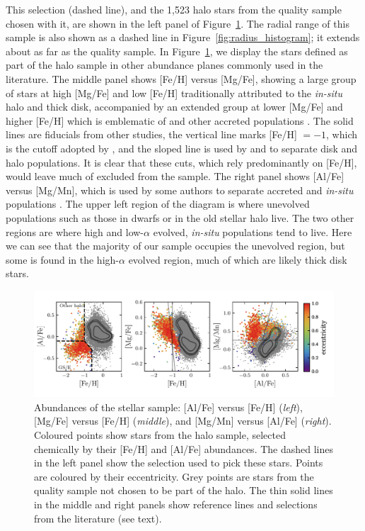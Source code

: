 This selection (dashed line), and the 1,523 halo stars from the quality sample chosen with it, are shown in the left panel of Figure~\ref{fig:halo_abundances}. The radial range of this sample is also shown as a dashed line in Figure~\ref{fig:radius_histogram}; it extends about as far as the quality sample. In Figure~\ref{fig:halo_abundances}, we display the stars defined as part of the halo sample in other abundance planes commonly used in the literature. The middle panel shows [Fe/H] versus [Mg/Fe], showing a large group of stars at high [Mg/Fe] and low [Fe/H] traditionally attributed to the \textit{in-situ} halo and thick disk, accompanied by an extended group at lower [Mg/Fe] and higher [Fe/H] which is emblematic of \gse and other accreted populations \parencite[e.g.][]{hasselquist21,horta23a}. The solid lines are fiducials from other studies, the vertical line marks [Fe/H] $= -1$, which is the cutoff adopted by \cite{mackereth20}, and the sloped line is used by \textcite{mackereth19a} and \cite{lane22} to separate disk and halo populations. It is clear that these cuts, which rely predominantly on [Fe/H], would leave much of \gse excluded from the sample. The right panel shows [Al/Fe] versus [Mg/Mn], which is used by some authors to separate accreted and \textit{in-situ} populations \parencite[e.g.][]{das20,horta21a,fernandez23}. The upper left region of the diagram is where unevolved populations such as those in dwarfs or in the old stellar halo live. The two other regions are where high and low-$\alpha$ evolved, \textit{in-situ} populations tend to live. Here we can see that the majority of our sample occupies the unevolved region, but some is found in the high-$\alpha$ evolved region, much of which are likely thick disk stars.

\begin{figure}
    \centering
    \includegraphics[width=\linewidth]{figure/ch3/halo_abundances.pdf}
    \caption{Abundances of the stellar sample: [Al/Fe] versus [Fe/H] (\textit{left}), [Mg/Fe] versus [Fe/H] (\textit{middle}), and [Mg/Mn] versus [Al/Fe] (\textit{right}). Coloured points show stars from the halo sample, selected chemically by their [Fe/H] and [Al/Fe] abundances. The dashed lines in the left panel show the selection used to pick these stars. Points are coloured by their eccentricity. Grey points are stars from the quality sample not chosen to be part of the halo. The thin solid lines in the middle and right panels show reference lines and selections from the literature (see text).}
    \label{fig:halo_abundances}
\end{figure}

